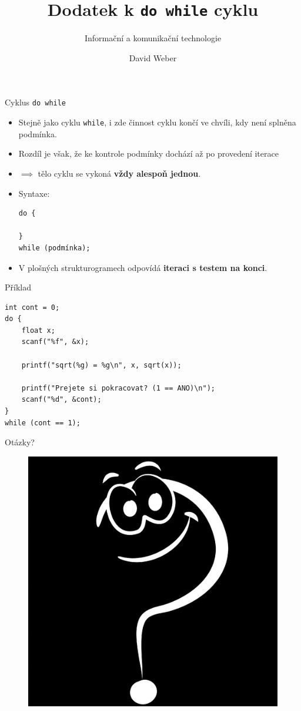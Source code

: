 \documentclass[14pt,aspectratio=169]{beamer}
\subtitle{Informační a komunikační technologie}
\title{Dodatek k \texttt{do while} cyklu}
\author{David Weber}
\begin{document}

    \begin{frame}
        \titlepage
    \end{frame}

    \begin{frame}[t,fragile]{Cyklus \texttt{do while}}
        \begin{itemize}
            \item Stejně jako cyklu \texttt{while}, i zde činnost cyklu končí ve chvíli, kdy není splněna podmínka.
            \item Rozdíl je však, že ke kontrole podmínky dochází až po provedení iterace
            \item $\implies$ tělo cyklu se vykoná \textbf{vždy alespoň jednou}.
            \item Syntaxe:
            \begin{lstlisting}
do {

}
while (podmínka);
            \end{lstlisting}
            \item V plošných strukturogramech odpovídá \textbf{iteraci s testem na konci}.
        \end{itemize}
    \end{frame}

    \begin{frame}[t,fragile]{Příklad}
        \begin{lstlisting}
int cont = 0;
do {
    float x;
    scanf("%f", &x);

    printf("sqrt(%g) = %g\n", x, sqrt(x));

    printf("Prejete si pokracovat? (1 == ANO)\n");
    scanf("%d", &cont);
}
while (cont == 1);
        \end{lstlisting}
    \end{frame}

    \begin{frame}{Otázky?}
        \begin{figure}
            \centering
            \includegraphics[scale=.4]{images/discussion_inverted.png}
        \end{figure}
    \end{frame}
\end{document}
